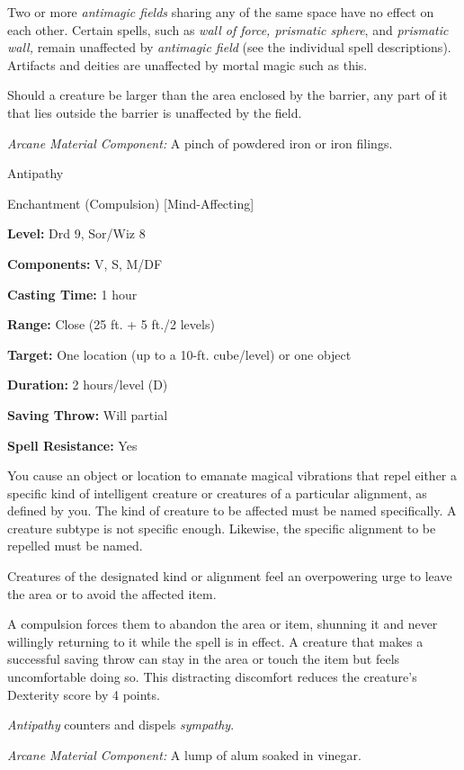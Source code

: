 \documentclass{article}
\begin{document}
Two or more \textit{antimagic fields }sharing any of the same space have no effect 
on each other. Certain spells, such as \textit{wall of force, prismatic sphere}, 
and \textit{prismatic wall, }remain unaffected by \textit{antimagic field }(see 
the individual spell descriptions). Artifacts and deities are unaffected by mortal 
magic such as this. 

Should a creature be larger than the area enclosed by the barrier, any part of 
it that lies outside the barrier is unaffected by the field.

\textit{Arcane Material Component: }A pinch of powdered iron or iron filings.

\vspace{12pt}
Antipathy

Enchantment (Compulsion) [Mind-Affecting]

\textbf{Level:} Drd 9, Sor/Wiz 8

\textbf{Components:} V, S, M/DF

\textbf{Casting Time:} 1 hour

\textbf{Range:} Close (25 ft. + 5 ft./2 levels)

\textbf{Target:} One location (up to a 10-ft. cube/level) or one object

\textbf{Duration:} 2 hours/level (D)

\textbf{Saving Throw: }Will partial

\textbf{Spell Resistance:} Yes

You cause an object or location to emanate magical vibrations that repel either 
a specific kind of intelligent creature or creatures of a particular alignment, 
as defined by you. The kind of creature to be affected must be named specifically. 
A creature subtype is not specific enough. Likewise, the specific alignment to 
be repelled must be named.

Creatures of the designated kind or alignment feel an overpowering urge to leave 
the area or to avoid the affected item.

A compulsion forces them to abandon the area or item, shunning it and never willingly 
returning to it while the spell is in effect. A creature that makes a successful 
saving throw can stay in the area or touch the item but feels uncomfortable doing 
so. This distracting discomfort reduces the creature's Dexterity score by 4 points.

\textit{Antipathy }counters and dispels \textit{sympathy}.

\textit{Arcane Material Component: }A lump of alum soaked in vinegar.
\end{document}
